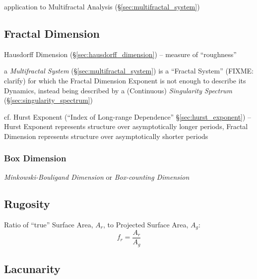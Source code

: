application to Multifractal Analysis (\S\ref{sec:multifractal_system})



\subsection{Fractal Dimension}\label{sec:fractal_dimension}

Hausdorff Dimension (\S\ref{sec:hausdorff_dimension}) -- measure of
``roughness''

\fist a \emph{Multifractal System} (\S\ref{sec:multifractal_system}) is a
``Fractal System'' (FIXME: clarify) for which the Fractal Dimension Exponent is
not enough to describe its Dynamics, instead being described by a (Continuous)
\emph{Singularity Spectrum} (\S\ref{sec:singularity_spectrum})

cf. Hurst Exponent (``Index of Long-range Dependence''
\S\ref{sec:hurst_exponent}) -- Hurst Exponent represents structure over
asymptotically longer periods, Fractal Dimension represents structure over
asymptotically shorter periods



\subsubsection{Box Dimension}\label{sec:box_dimension}

\emph{Minkowski-Bouligand Dimension} or \emph{Box-counting Dimension}



\subsection{Rugosity}\label{sec:rugosity}

Ratio of ``true'' Surface Area, $A_r$, to Projected Surface Area, $A_g$:
\[
  f_r = \frac{A_r}{A_g}
\]



\subsection{Lacunarity}\label{sec:lacunarity}

